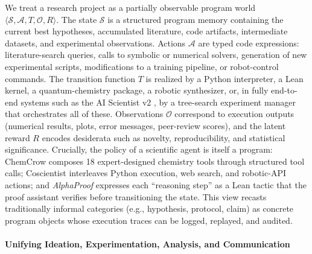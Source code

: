 We treat a research project as a partially observable program world $\langle \mathcal{S}, \mathcal{A}, T, \mathcal{O}, R\rangle$. The state $\mathcal{S}$ is a structured program memory containing the current best hypotheses, accumulated literature, code artifacts, intermediate datasets, and experimental observations. Actions $\mathcal{A}$ are typed code expressions: literature-search queries, calls to symbolic or numerical solvers, generation of new experimental scripts, modifications to a training pipeline, or robot-control commands. The transition function $T$ is realized by a Python interpreter, a Lean kernel, a quantum-chemistry package, a robotic synthesizer, or, in fully end-to-end systems such as the AI Scientist v2 \citep{yamada2025aiscientistv2workshoplevelautomated}, by a tree-search experiment manager that orchestrates all of these. Observations $\mathcal{O}$ correspond to execution outputs (numerical results, plots, error messages, peer-review scores), and the latent reward $R$ encodes desiderata such as novelty, reproducibility, and statistical significance. Crucially, the policy of a scientific agent is itself a program: ChemCrow \citep{bran2023chemcrowaugmentinglargelanguagemodels} composes 18 expert-designed chemistry tools through structured tool calls; Coscientist \citep{boiko2023autonomous} interleaves Python execution, web search, and robotic-API actions; and \textit{AlphaProof} \citep{hubert2025olympiad} expresses each ``reasoning step'' as a Lean tactic that the proof assistant verifies before transitioning the state. This view recasts traditionally informal categories (e.g., hypothesis, protocol, claim) as concrete program objects whose execution traces can be logged, replayed, and audited.

\paragraph{Unifying Ideation, Experimentation, Analysis, and Communication}

